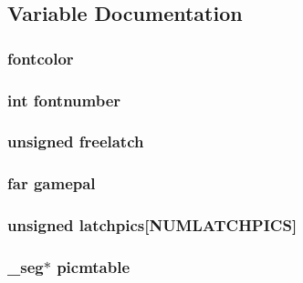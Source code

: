 \subsection{Variable Documentation}
\hypertarget{ID__VH_8H_a37dfad01117cac8636922fd4d030131b}{
\subsubsection[{fontcolor}]{ {\bf fontcolor}}}
\label{ID__VH_8H_a37dfad01117cac8636922fd4d030131b}
\hypertarget{ID__VH_8H_a4837949d7c7b2ed1e3f5874b69986fd8}{
\subsubsection[{fontnumber}]{\setlength{\rightskip}{0pt plus 5cm}int {\bf fontnumber}}}
\label{ID__VH_8H_a4837949d7c7b2ed1e3f5874b69986fd8}
\hypertarget{ID__VH_8H_a98fdbc277691b144bd2fcbceec9047f9}{
\subsubsection[{freelatch}]{\setlength{\rightskip}{0pt plus 5cm}unsigned {\bf freelatch}}}
\label{ID__VH_8H_a98fdbc277691b144bd2fcbceec9047f9}
\hypertarget{ID__VH_8H_a72ce00e98a92644d4cbf41fb10a2f7ad}{
\subsubsection[{gamepal}]{ far {\bf gamepal}}}
\label{ID__VH_8H_a72ce00e98a92644d4cbf41fb10a2f7ad}
\hypertarget{ID__VH_8H_adbe64e9f4cdaee2e69ce2b915bd5c9ff}{
\subsubsection[{latchpics}]{\setlength{\rightskip}{0pt plus 5cm}unsigned {\bf latchpics}\mbox{[}NUMLATCHPICS\mbox{]}}}
\label{ID__VH_8H_adbe64e9f4cdaee2e69ce2b915bd5c9ff}
\hypertarget{ID__VH_8H_a5888fd9fd64478e98ddbe25d9114a3dd}{
\subsubsection[{picmtable}]{ \_\-seg$\ast$ {\bf picmtable}}}
